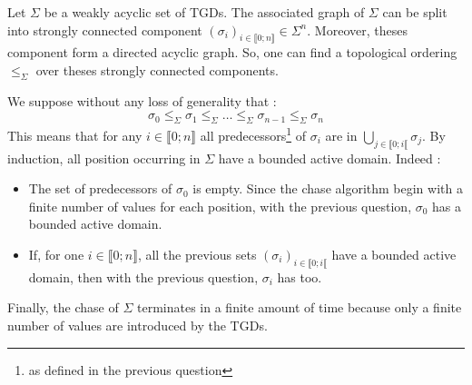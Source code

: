 \documentclass{../../cs-classes/cs-classes}
\begin{document}
\begin{exercise}
    Let $\Sigma$ be a weakly acyclic set of TGDs. The associated graph of
    $\Sigma$ can be split into strongly connected component
    $\left(\sigma_i\right)_{i\in\llbracket0;n\rrbracket} \in \Sigma^n$.
    Moreover, theses component form a directed acyclic graph. So, one can find a
    topological ordering $\leqslant_{\Sigma}$ over theses strongly connected
    components.

    We suppose without any loss of generality that :
    \begin{equation*}
        \sigma_0 \leqslant_{\Sigma} \sigma_1 \leqslant_{\Sigma} \dots \leqslant_{\Sigma} \sigma_{n-1} \leqslant_{\Sigma} \sigma_n
    \end{equation*}
    This means that for any $i \in\llbracket0;n\rrbracket$ all predecessors\footnote{as defined in the previous question}
    of $\sigma_i$ are in $\bigcup_{j\in\llbracket0;i\llbracket} \sigma_j$.
    By induction, all position occurring in $\Sigma$ have a bounded active
    domain. Indeed :
    \begin{itemize}
        \item The set of predecessors of $\sigma_0$ is empty. Since the chase
              algorithm begin with a finite number of values for each position,
              with the previous question, $\sigma_0$ has a bounded active domain.
        \item If, for one $i \in \llbracket0;n\rrbracket$, all the previous sets
              $\left(\sigma_i\right)_{i\in\llbracket0;i\llbracket}$ have a
              bounded active domain, then with the previous question, $\sigma_i$
              has too.
    \end{itemize}

    Finally, the chase of $\Sigma$ terminates in a finite amount of time because
    only a finite number of values are introduced by the TGDs.
\end{exercise}
\end{document}
